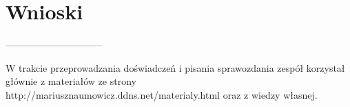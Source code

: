 \documentclass[polish,a4paper]{article}
\begin{document}
\section{Wnioski}
------------------------------
%
%




\begin{thebibliography}{9}

  W trakcie przeprowadzania doświadczeń i pisania sprawozdania zespół korzystał głównie z materiałów ze strony http://mariusznaumowicz.ddns.net/materialy.html oraz z wiedzy własnej.

\end{thebibliography}
\end{document}
